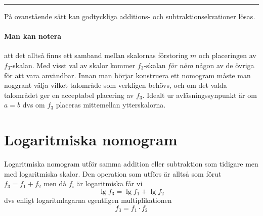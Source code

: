 \documentclass[oneside,11pt,a4paper,swedish]{scrbook}
\newcommand{\slutex}{\begin{flushright} \rule{1ex}{1ex} \end{flushright}}
\begin{document}

\slutex

På ovanstående sätt kan godtyckliga additions- och subtraktionsekvationer lösas.

\paragraph{Man kan notera} att det alltså finns ett samband mellan skalornas förstoring $m$ och placeringen av $f_3$-skalan. Med visst val av skalor kommer $f_3$-skalan \emph{för nära} någon av de övriga för att vara användbar. Innan man börjar konstruera ett nomogram måste man noggrant välja vilket talområde som verkligen behövs, och om det valda talområdet ger en acceptabel placering av $f_3$. Idealt ur avläsningssynpunkt är om $a=b$ dvs om $f_3$ placeras mittemellan ytterskalorna.

\section{Logaritmiska nomogram}

Logaritmiska nomogram utför samma addition eller subtraktion som tidigare men med logaritmiska skalor. Den operation som utförs är alltså som förut $f_3=f_1+f_2$ men då $f_i$ är logaritmiska får vi \[\lg f_3= \lg f_1 + \lg f_2\] dvs enligt logaritmlagarna egentligen multiplikationen \[f_3= f_1 \cdot f_2\]
\end{document}
